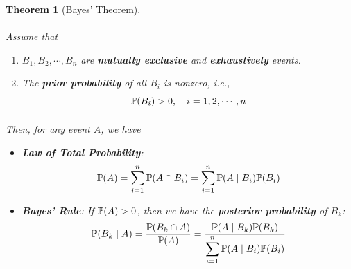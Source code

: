 \documentclass[10pt,UTF8]{article}
\newenvironment{definition box}
{\begin{tcolorbox}[colback=blue!5!white,colframe=blue!75!black,parbox=false,before upper=\par,before lower=\par]}
{\end{tcolorbox}}
\newenvironment{theorem box}
{\begin{tcolorbox}[colback=yellow!5!white,colframe=yellow!75!black,parbox=false,before upper=\par,before lower=\par]}
{\end{tcolorbox}}
\theoremstyle{definition}
\newtheorem{definition inner}{Definition}[section]
\theoremstyle{plain}
\newtheorem{theorem inner}{Theorem}[section]
\newenvironment{theorem}[1][]
{\begin{theorem box}\begin{theorem inner}[#1]\hfill\par}
{\end{theorem inner}\end{theorem box}}
\theoremstyle{definition}
\newtheorem*{proof inner}{\textit{Proof}}
\theoremstyle{remark}
\newcommand{\Prob}{\mathbb{P}\qty}
\begin{document}
\begin{theorem}[Bayes' Theorem]
    \paragraph*{}Assume that
    \begin{enumerate}
        \item $B_1, B_2, \cdots, B_n$ are \textbf{mutually exclusive} and \textbf{exhaustively} events.
        \item The \textbf{prior probability} of all $B_i$ is nonzero, i.e.,
        \begin{equation*}
            \Prob(B_i) > 0, \quad i = 1, 2, \cdots, n
        \end{equation*}
    \end{enumerate}

    \paragraph*{}Then, for any event $A$, we have
    \begin{itemize}
        \item \textbf{Law of Total Probability}:
        \begin{equation*}
            \Prob(A) = \sum_{i=1}^n \Prob(A \cap B_i) = \sum_{i=1}^n \Prob(A\mid B_i) \Prob(B_i)
        \end{equation*}
        \item \textbf{Bayes' Rule}: If $\Prob(A)>0$, then we have
        the \textbf{posterior probability} of $B_k$:
        \begin{equation*}
            \Prob(B_k\mid A) = \frac{\Prob(B_k\cap A)}{\Prob(A)} = 
            \frac{\Prob(A\mid B_k) \Prob(B_k)}{\displaystyle\sum_{i=1}^n \Prob(A\mid B_i) \Prob(B_i)}
        \end{equation*}
    \end{itemize}
\end{theorem}
\end{document}
